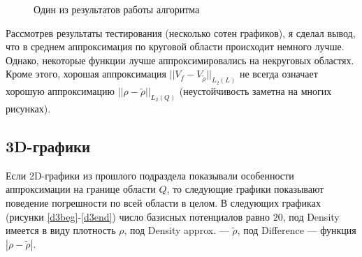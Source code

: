 \documentclass[a4paper, 12pt]{article}
\begin{document}
                  \begin{figure}[h] 
                    \vfill 
                    \caption{Один из результатов работы алгоритма} 
                    \label{hexampl} 
                    \end{figure}                                        

Рассмотрев результаты тестирования (несколько сотен графиков), я сделал вывод, что в среднем аппроксимация по круговой области происходит немного лучше.
Однако, некоторые функции лучше аппроксимировались на некруговых областях.
Кроме этого, хорошая аппроксимация $||V_f-V_{\tilde{\rho} } ||_{L_2(L)}$ не всегда означает хорошую аппроксимацию $||\rho-\tilde{\rho} ||_{L_2(Q)}$ (неустойчивость заметна на многих рисунках).%

\subsection{3D-графики}
Если 2D-графики из прошлого подраздела показывали особенности аппроксимации на границе области $Q$, то следующие графики показывают поведение погрешности по всей области в целом.
В следующих графиках (рисунки \ref{d3beg}-\ref{d3end}) число базисных потенциалов равно $20$, под Density имеется в виду плотность $\rho$, под Density approx. --- $\tilde{\rho}$, под Difference --- функция $|\rho-\tilde{\rho}|$.
\end{document}
